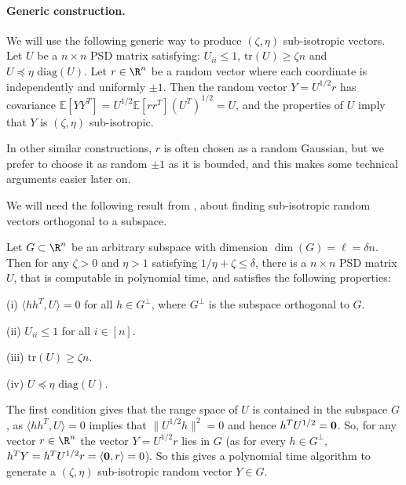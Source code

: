 \documentclass{toc}
\newcommand{\ip}[1]{\langle #1 \rangle}
\newcommand{\E}{\mathbb{E}}
\begin{document}
%
\paragraph{Generic construction.}   %
We will use the following generic way to produce $(\zeta,\eta)$ sub-isotropic vectors. Let $U$ be a $n\times n$ PSD matrix satisfying: $U_{ii} \leq 1$, $\text{tr}(U) \geq \zeta n$ and $ U \preceq \eta \text{ diag}(U)$. Let $r \in \R^n$ be  a random vector where each coordinate is independently and uniformly $\pm 1$. Then the random vector 
$Y = U^{1/2}r$ has covariance $\E[YY^T]= U^{1/2} \E[rr^T] (U^T)^{1/2} = U$, and the properties of $U$ imply that $Y$ 
is $(\zeta,\eta)$ sub-isotropic.

%
%
\begin{remark}   %
In other similar constructions, $r$ is often chosen as a random Gaussian, but we prefer to choose it as random $\pm 1$ as it is bounded, and this makes some technical arguments easier later on.
\end{remark}

We will need the following result from \cite{BG17}, about finding sub-isotropic random vectors orthogonal to a subspace.
\begin{theorem}
\label{thm:bg17}
Let $G \subset \R^n$ be an arbitrary subspace with dimension $\dim(G)=\ell =  \delta n$. Then for any $\zeta>0 $ and $\eta>1$ satisfying $1/\eta + \zeta \leq \delta$, there is a $n \times n$ PSD matrix $U$, that is computable in polynomial time, and satisfies the following properties:

(i) $\langle  hh^T,U \rangle =0$  for all $h \in G^{\perp}$, where $G^{\perp}$ is the subspace orthogonal to $G$.

(ii)
$U_{ii} \leq 1$ for all $i\in [n]$.

(iii) $\textrm{tr}(U) \geq \zeta n$.

(iv) $ U\preceq \eta \text{ diag}(U)$.
\end{theorem}
The first condition gives that the range space of $U$ is contained in the subspace $G$, as $\langle  hh^T,U \rangle = 0$ implies that $\| U^{1/2} h \|^2=0$ and hence $h^T U^{1/2}=\bf{0}$. So, for any vector $r \in \R^n$ the vector $Y= U^{1/2} r$ lies in $G$ (as for every $h \in G^{\perp}$, $h^T Y=  h^T U^{1/2} r = \ip{{\bf 0}, r} = 0$).
So this gives a polynomial time algorithm to generate a $(\zeta,\eta)$ sub-isotropic random vector $Y \in G$.
%
%
\end{document}
